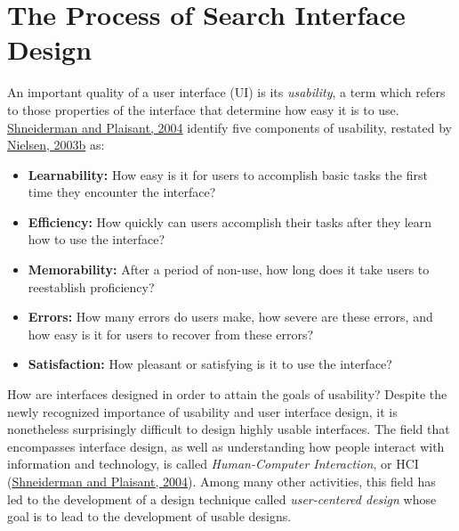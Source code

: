 \documentclass[sigconf,nonacm,screen,pbalance]{acmart}
\begin{document}
\section{The Process of Search Interface Design}

An important quality of a user interface (UI) is its {\em  usability}, a term which refers to those
properties of the interface that determine how easy it is to use. \href{https://searchuserinterfaces.com/book/sui_references.html#shneiderman:dui}{Shneiderman and Plaisant, 2004} identify five components of usability, restated by \href{https://searchuserinterfaces.com/book/sui_references.html#nielsen2003u}{Nielsen, 2003b} as:

\begin{itemize}[leftmargin=1em,labelwidth=*]
\item {\bf  Learnability:} How easy is it for users to accomplish basic tasks the first time they
encounter the interface? 
\item {\bf  Efficiency:} How quickly can users accomplish their tasks after they learn how to use the
interface? 
\item {\bf  Memorability:} After a period of non-use, how long does it take users to reestablish
proficiency? 
\item {\bf  Errors:} How many errors do users make, how severe are these errors, and how easy is it for
users to recover from these errors? 
\item {\bf  Satisfaction:} How pleasant or satisfying is it to use the interface? 
\end{itemize}

How are interfaces designed in order to attain the goals of usability? Despite the newly recognized
importance of usability and user interface design, it is nonetheless surprisingly difficult to design
highly usable interfaces. The field that encompasses interface design, as well as understanding how people
interact with information and technology, is called {\em  Human-Computer Interaction}, or HCI (\href{https://searchuserinterfaces.com/book/sui_references.html#shneiderman:dui}{Shneiderman and Plaisant, 2004}). Among many other activities, this field has led to the
development of a design technique called {\em  user-centered design} whose goal is to lead to the
development of usable designs.
\end{document}
